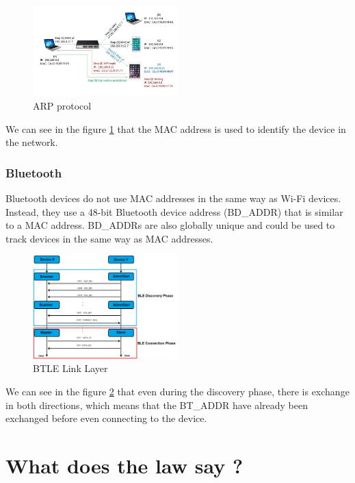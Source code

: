 \documentclass[aps,prb,twocolumn,superscriptaddress,floatfix,longbibliography,nofootinbib]{revtex4-2}
\begin{document}
  \begin{figure}[H]
      \centering
      \includegraphics[width=0.5\textwidth]{pictures/arp.jpg}
      \caption{ARP protocol \cite{ARP}}
      \label{fig:ARP}
  \end{figure}
  We can see in the figure \ref{fig:ARP} that the MAC address is used to identify the device in the network.



    \subsubsection{\label{subsec:Bluetooth}Bluetooth}
    Bluetooth devices do not use MAC addresses in the same way as Wi-Fi devices.
    Instead, they use a 48-bit Bluetooth device address (BD\_ADDR) that is similar to a MAC address.
    BD\_ADDRs are also globally unique and could be used to track devices in the same way as MAC addresses.
    \begin{figure}[H]
        \centering
        \includegraphics[width=0.5\textwidth]{pictures/Link-Layer-Roles-Change_ver1.png}
        \caption{BTLE Link Layer \cite{BLE5}}
        \label{fig:BT}
    \end{figure}
    We can see in the figure \ref{fig:BT} that even during the discovery phase, there
    is exchange in both directions, which means that the BT\_ADDR have already been 
    exchanged before even connecting to the device.


\section{\label{sec:Law}What does the law say ?}
\end{document}
